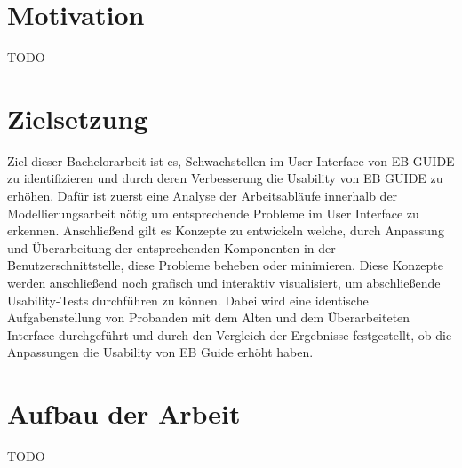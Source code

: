 \section{Motivation}
TODO

\section{Zielsetzung}
Ziel dieser Bachelorarbeit ist es, Schwachstellen im User Interface von EB GUIDE zu identifizieren und durch deren Verbesserung die Usability von EB GUIDE zu erhöhen.
Dafür ist zuerst eine Analyse der Arbeitsabläufe innerhalb der Modellierungsarbeit nötig um entsprechende Probleme im User Interface zu erkennen.
Anschließend gilt es Konzepte zu entwickeln welche, durch Anpassung und Überarbeitung der entsprechenden Komponenten in der Benutzerschnittstelle, diese Probleme beheben oder minimieren.
Diese Konzepte werden anschließend noch grafisch und interaktiv visualisiert, um abschließende Usability-Tests durchführen zu können.
Dabei wird eine identische Aufgabenstellung von Probanden mit dem Alten und dem Überarbeiteten Interface durchgeführt und durch den Vergleich der Ergebnisse festgestellt, ob die Anpassungen die Usability von EB Guide erhöht haben.

\section{Aufbau der Arbeit}
TODO